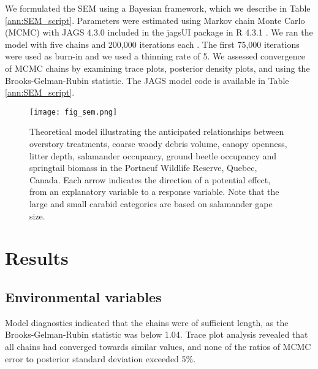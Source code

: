 We formulated the SEM using a Bayesian framework, which we describe in Table \ref{ann:SEM_script}. 
Parameters were estimated using Markov chain Monte Carlo (MCMC) with JAGS 4.3.0 included in the jagsUI package in R 4.3.1 \citep{lunnBUGSProjectEvolution2009,rcoreteamLanguageEnvironmentStatistical2020,kellnerJagsUIWrapperRjags2024}. 
We ran the model with five chains and 200,000 iterations each \citep{gelmanUnderstandingPredictiveInformation2014}. 
The first 75,000 iterations were used as burn-in and we used a thinning rate of 5. 
We assessed convergence of MCMC chains by examining trace plots, posterior density plots, and using the Brooks-Gelman-Rubin statistic. 
The JAGS model code is available in Table \ref{ann:SEM_script}.

\vspace{10pt}

\begin{figure}[h!]
	\centering
	\texttt{[image: fig\_sem.png]}
	\caption[Theoretical model illustrating the anticipated relationships between overstory treatments, environmental variables and species groups.]
  {Theoretical model illustrating the anticipated relationships between overstory treatments, coarse woody debris volume, canopy openness, litter depth,
   salamander occupancy, ground beetle occupancy and springtail biomass in the Portneuf Wildlife Reserve, Quebec, Canada. 
   Each arrow indicates the direction of a potential effect, from an explanatory variable to a response variable. 
   Note that the large and small carabid categories are based on salamander gape size.}
	\label{fig:SEM}
\end{figure} 

\clearpage

\section*{Results}
\label{sec:results1}


\subsection*{Environmental variables}
\label{subsec:ResEnv}

Model diagnostics indicated that the chains were of sufficient length, as the Brooks-Gelman-Rubin statistic was below 1.04. 
Trace plot analysis revealed that all chains had converged towards similar values, and none of the ratios of MCMC error to posterior standard deviation exceeded 5\%.

